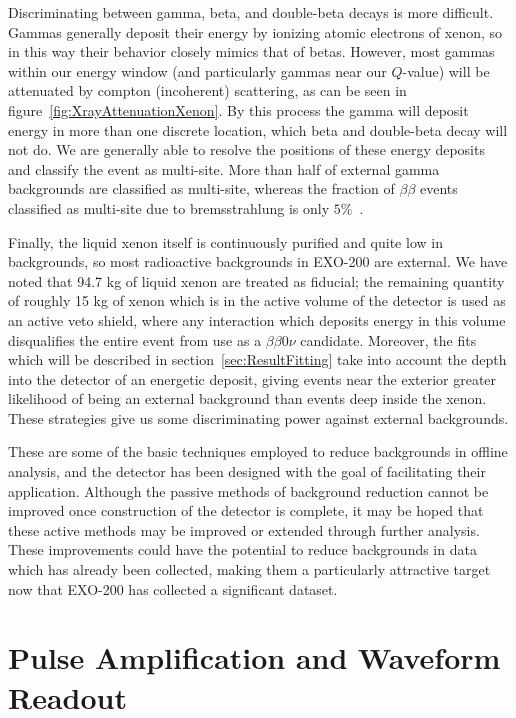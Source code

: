 Discriminating between gamma, beta, and double-beta decays is more difficult.  Gammas generally deposit their energy by ionizing atomic electrons of xenon, so in this way their behavior closely mimics that of betas.  However, most gammas within our energy window (and particularly gammas near our $Q$-value) will be attenuated by compton (incoherent) scattering, as can be seen in figure~\ref{fig:XrayAttenuationXenon}.  By this process the gamma will deposit energy in more than one discrete location, which beta and double-beta decay will not do.  We are generally able to resolve the positions of these energy deposits and classify the event as multi-site. More than half of external gamma backgrounds are classified as multi-site, whereas the fraction of $\beta\beta$ events classified as multi-site due to bremsstrahlung is only $5\%$~\cite{bb2nEXO2014}.

Finally, the liquid xenon itself is continuously purified and quite low in backgrounds, so most radioactive backgrounds in EXO-200 are external.  We have noted that 94.7 kg of liquid xenon are treated as fiducial; the remaining quantity of roughly 15 kg of xenon which is in the active volume of the detector is used as an active veto shield, where any interaction which deposits energy in this volume disqualifies the entire event from use as a $\beta\beta 0\nu$ candidate.  Moreover, the fits which will be described in section~\ref{sec:ResultFitting} take into account the depth into the detector of an energetic deposit, giving events near the exterior greater likelihood of being an external background than events deep inside the xenon.  These strategies give us some discriminating power against external backgrounds.

These are some of the basic techniques employed to reduce backgrounds in offline analysis, and the detector has been designed with the goal of facilitating their application.  Although the passive methods of background reduction cannot be improved once construction of the detector is complete, it may be hoped that these active methods may be improved or extended through further analysis.  These improvements could have the potential to reduce backgrounds in data which has already been collected, making them a particularly attractive target now that EXO-200 has collected a significant dataset.

\section{Pulse Amplification and Waveform Readout}\label{sec:DetectorReadout}

